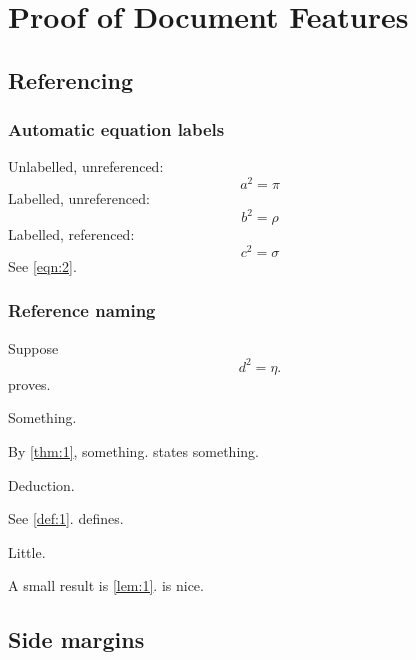 \layout

\setcounter{chapter}{-1}
\chapter{Proof of Document Features}

\section{Referencing}

\subsection{Automatic equation labels}
Unlabelled, unreferenced:
\begin{equation}
	a^2 = π
\end{equation}
Labelled, unreferenced:
\begin{equation}
	\label{eqn:1}
	b^2 = ρ
\end{equation}
Labelled, referenced:
\begin{equation}
	\label{eqn:2}
	c^2 = σ
\end{equation}
See \cref{eqn:2}.

\subsection{Reference naming}
Suppose
\begin{equation}
	\label{eqn:3}
	d^2 = η
.\end{equation}
 proves.
\begin{theorem}[Diogenes]
	\label{thm:1}
	Something.
\end{theorem}
By \cref{thm:1}, something.  states something.
\begin{definition}
	\label{def:1}
	Deduction.
\end{definition}
See \cref{def:1}.  defines.
\begin{lemma}
	\label{lem:1}
	Little.
\end{lemma}
A small result is \cref{lem:1}.  is nice.


\section{Side margins}

\lipsum[1][1-6]
\lipsum[2][1-3]\sidenote{
	\lipsum[4][1-4]
}
\lipsum[3][1]
\lipsum[3][2-4]

